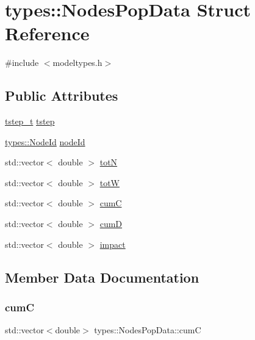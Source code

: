 \hypertarget{structtypes_1_1_nodes_pop_data}{}\section{types\+::Nodes\+Pop\+Data Struct Reference}
\label{structtypes_1_1_nodes_pop_data}


{\ttfamily \#include $<$modeltypes.\+h$>$}

\subsection*{Public Attributes}
\begin{DoxyCompactItemize}
\item 
\mbox{\hyperlink{namespacetypes_a9dc53a5ce11a196d82a6983030de8028}{tstep\+\_\+t}} \mbox{\hyperlink{structtypes_1_1_nodes_pop_data_ad89a465da8199ed510ce8077813bf79b}{tstep}}
\item 
\mbox{\hyperlink{classtypes_1_1_node_id}{types\+::\+Node\+Id}} \mbox{\hyperlink{structtypes_1_1_nodes_pop_data_aa24e93c5058cd780d94bd8adca2592cf}{node\+Id}}
\item 
std\+::vector$<$ double $>$ \mbox{\hyperlink{structtypes_1_1_nodes_pop_data_a8c065e533fb25bce3a6557fc20a8475a}{totN}}
\item 
std\+::vector$<$ double $>$ \mbox{\hyperlink{structtypes_1_1_nodes_pop_data_a63541b476b364d256ffb42ecec3e6c9d}{totW}}
\item 
std\+::vector$<$ double $>$ \mbox{\hyperlink{structtypes_1_1_nodes_pop_data_a1e84953aa36611b8025fe69bc4085c0c}{cumC}}
\item 
std\+::vector$<$ double $>$ \mbox{\hyperlink{structtypes_1_1_nodes_pop_data_a711e23a33053e1523fd64100d09d1b43}{cumD}}
\item 
std\+::vector$<$ double $>$ \mbox{\hyperlink{structtypes_1_1_nodes_pop_data_aae0c0640f8be8733a718bb55323ae76d}{impact}}
\end{DoxyCompactItemize}


\subsection{Member Data Documentation}
\mbox{\label{structtypes_1_1_nodes_pop_data_a1e84953aa36611b8025fe69bc4085c0c}} 
\subsubsection{\texorpdfstring{cumC}{cumC}}
{\footnotesize\ttfamily std\+::vector$<$double$>$ types\+::\+Nodes\+Pop\+Data\+::cumC}

